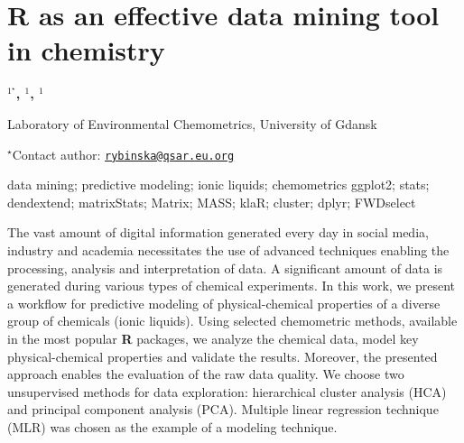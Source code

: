 \documentclass[\main/boa.tex]{subfiles}
\begin{document}
\section{R as an effective data mining tool in chemistry}

\begin{center}
  {\bf {}$^{1^\star}$, $^{1}$, $^{1}$}
\end{center}

\vskip 0.3cm

\begin{affiliations}
\begin{enumerate}
\begin{minipage}{0.915\textwidth}
\centering
\item Laboratory of Environmental Chemometrics, University of Gdansk \\[-2pt]
\end{minipage}
\end{enumerate}
$^\star$Contact author: \href{mailto:rybinska@qsar.eu.org}{\nolinkurl{rybinska@qsar.eu.org}}\\
\end{affiliations}

\vskip 0.5cm

\begin{minipage}{0.915\textwidth}
\keywords data mining; predictive modeling; ionic liquids; chemometrics
\packages ggplot2; stats; dendextend; matrixStats; Matrix; MASS; klaR; cluster;
dplyr; FWDselect
\end{minipage}

\vskip 0.8cm

The vast amount of digital information generated every day in social
media, industry and academia necessitates the use of advanced techniques
enabling the processing, analysis and interpretation of data. A
significant amount of data is generated during various types of chemical
experiments. In this work, we present a workflow for predictive modeling
of physical-chemical properties of a diverse group of chemicals (ionic
liquids). Using selected chemometric methods, available in the most
popular \textbf{R} packages, we analyze the chemical data, model key
physical-chemical properties and validate the results. Moreover, the
presented approach enables the evaluation of the raw data quality. We
choose two unsupervised methods for data exploration: hierarchical
cluster analysis (HCA) and principal component analysis (PCA). Multiple
linear regression technique (MLR) was chosen as the example of a
modeling technique.
\end{document}

